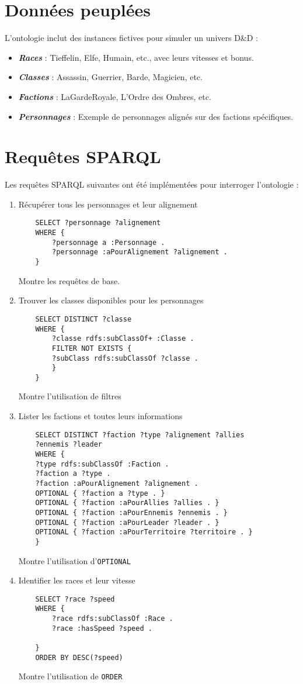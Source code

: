 \documentclass{article}
\newcommand{\cmd}[1]{\texttt{#1}}
\newcommand{\ib}[1]{\textit{\textbf{#1}}}
\begin{document}
\section{Données peuplées}

L'ontologie inclut des instances fictives pour simuler un univers D\&D :

\begin{itemize}
	\item \ib{Races} : Tieffelin, Elfe, Humain, etc., avec leurs vitesses et bonus.
	\item \ib{Classes} : Assassin, Guerrier, Barde, Magicien, etc.
	\item \ib{Factions} : LaGardeRoyale, L'Ordre des Ombres, etc.
	\item \ib{Personnages} : Exemple de personnages alignés sur des factions spécifiques.
\end{itemize}

\section{Requêtes SPARQL}

Les requêtes SPARQL suivantes ont été implémentées pour interroger l'ontologie :

\begin{enumerate}
	\item Récupérer tous les personnages et leur alignement
	\begin{lstlisting}
	SELECT ?personnage ?alignement
	WHERE {
		?personnage a :Personnage .
		?personnage :aPourAlignement ?alignement .
	}
	\end{lstlisting}
Montre les requêtes de base.
	\item Trouver les classes disponibles pour les personnages
	\begin{lstlisting}
	SELECT DISTINCT ?classe
	WHERE {
		?classe rdfs:subClassOf+ :Classe .
		FILTER NOT EXISTS {
		?subClass rdfs:subClassOf ?classe .
		}
	}
	\end{lstlisting}
Montre l'utilisation de filtres
\newpage
	\item Lister les factions et toutes leurs informations
	\begin{lstlisting}
	SELECT DISTINCT ?faction ?type ?alignement ?allies
	?ennemis ?leader
	WHERE {
	?type rdfs:subClassOf :Faction .
	?faction a ?type .
	?faction :aPourAlignement ?alignement .
	OPTIONAL { ?faction a ?type . }
	OPTIONAL { ?faction :aPourAllies ?allies . }
	OPTIONAL { ?faction :aPourEnnemis ?ennemis . }
	OPTIONAL { ?faction :aPourLeader ?leader . }
	OPTIONAL { ?faction :aPourTerritoire ?territoire . }
	}
	\end{lstlisting}
Montre l'utilisation d'\cmd{OPTIONAL}
	\item Identifier les races et leur vitesse
	\begin{lstlisting}
	SELECT ?race ?speed
	WHERE {
		?race rdfs:subClassOf :Race .
		?race :hasSpeed ?speed .
		
	}
	ORDER BY DESC(?speed)
	\end{lstlisting}
Montre l'utilisation de \cmd{ORDER}
\end{enumerate}
\end{document}
